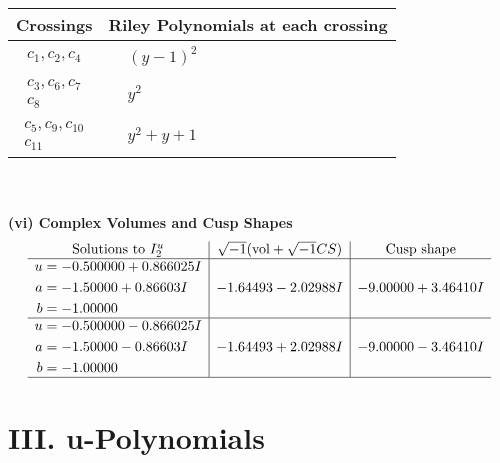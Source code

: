\documentclass[1p]{elsarticle_modified}
\theoremstyle{definition}
\newcommand{\I}{\sqrt{-1}}
\begin{document}
\begin{tabular}{m{50pt}|m{274pt}}
Crossings & \hspace{64pt}Riley Polynomials at each crossing \\
\hline $$\begin{aligned}c_{1},c_{2},c_{4}\end{aligned}$$&$\begin{aligned}
&(y-1)^2
\end{aligned}$\\
\hline $$\begin{aligned}c_{3},c_{6},c_{7}\\c_{8}\end{aligned}$$&$\begin{aligned}
&y^2
\end{aligned}$\\
\hline $$\begin{aligned}c_{5},c_{9},c_{10}\\c_{11}\end{aligned}$$&$\begin{aligned}
&y^2+y+1
\end{aligned}$\\
\hline
\end{tabular}\\~\\
\newpage\flushleft \textbf{(vi) Complex Volumes and Cusp Shapes}
$$\begin{array}{c|c|c}  
\text{Solutions to }I^u_{2}& \I (\text{vol} + \sqrt{-1}CS) & \text{Cusp shape}\\
 \hline 
\begin{aligned}
u &= -0.500000 + 0.866025 I \\
a &= -1.50000 + 0.86603 I \\
b &= -1.00000\phantom{ +0.000000I}\end{aligned}
 & -1.64493 - 2.02988 I & -9.00000 + 3.46410 I \\ \hline\begin{aligned}
u &= -0.500000 - 0.866025 I \\
a &= -1.50000 - 0.86603 I \\
b &= -1.00000\phantom{ +0.000000I}\end{aligned}
 & -1.64493 + 2.02988 I & -9.00000 - 3.46410 I\\
 \hline 
 \end{array}$$\newpage
\newpage\renewcommand{\arraystretch}{1}
\centering \section*{ III. u-Polynomials}
\end{document}
